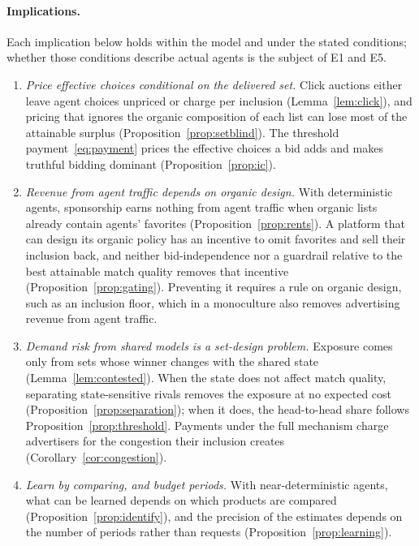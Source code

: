 \documentclass[opre,dblanonrev]{informs4}
\providecommand{\1}{\mathbf{1}}
\begin{document}
\paragraph{Implications.} Each implication below holds within the model and under the stated conditions; whether those conditions describe actual agents is the subject of E1 and E5.
\begin{enumerate}
\item \emph{Price effective choices conditional on the delivered set.} Click auctions either leave agent choices unpriced or charge per inclusion (Lemma~\ref{lem:click}), and pricing that ignores the organic composition of each list can lose most of the attainable surplus (Proposition~\ref{prop:setblind}). The threshold payment~\eqref{eq:payment} prices the effective choices a bid adds and makes truthful bidding dominant (Proposition~\ref{prop:ic}).
\item \emph{Revenue from agent traffic depends on organic design.} With deterministic agents, sponsorship earns nothing from agent traffic when organic lists already contain agents' favorites (Proposition~\ref{prop:rents}). A platform that can design its organic policy has an incentive to omit favorites and sell their inclusion back, and neither bid-independence nor a guardrail relative to the best attainable match quality removes that incentive (Proposition~\ref{prop:gating}). Preventing it requires a rule on organic design, such as an inclusion floor, which in a monoculture also removes advertising revenue from agent traffic.
\item \emph{Demand risk from shared models is a set-design problem.} Exposure comes only from sets whose winner changes with the shared state (Lemma~\ref{lem:contested}). When the state does not affect match quality, separating state-sensitive rivals removes the exposure at no expected cost (Proposition~\ref{prop:separation}); when it does, the head-to-head share follows Proposition~\ref{prop:threshold}. Payments under the full mechanism charge advertisers for the congestion their inclusion creates (Corollary~\ref{cor:congestion}).
\item \emph{Learn by comparing, and budget periods.} With near-deterministic agents, what can be learned depends on which products are compared (Proposition~\ref{prop:identify}), and the precision of the estimates depends on the number of periods rather than requests (Proposition~\ref{prop:learning}).
\end{enumerate}
\end{document}

